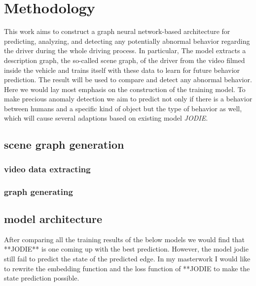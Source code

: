 \chapter{Methodology}\label{chapter:methodology}


This work aims to construct a graph neural network-based architecture for predicting, analyzing, and detecting any potentially abnormal behavior regarding the driver during the whole driving process. In particular, The model extracts a description graph, the so-called scene graph, of the driver from the video filmed inside the vehicle and trains itself with these data to learn for future behavior prediction. The result will be used to compare and detect any abnormal behavior. Here we would lay most emphasis on the construction of the training model. To make precious anomaly detection we aim to predict not only if there is a behavior between humans and a specific kind of object but the type of behavior as well, which will cause several adaptions based on existing model \textit{JODIE}.





\section{scene graph generation}


\subsection{video data extracting}
\subsection{graph generating}

\section{model architecture}




After comparing all the training results of the below models we would find that **JODIE** is one coming up with the best prediction. However, the model jodie still fail to predict the state of the predicted edge.
In my masterwork I would like to rewrite the embedding function and the loss function of **JODIE to make the state prediction possible.

